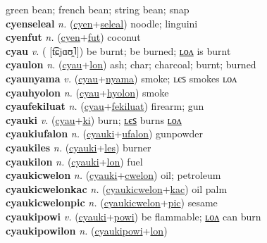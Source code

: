 green bean; french bean; string bean; snap \label{cyencim} \\
\textbf{cyenseleal} \textit{n.} (\hyperref[cyen]{cyen}+\hyperref[seleal]{seleal})
noodle; linguini \label{cyenseleal} \\
\textbf{cyenfut} \textit{n.} (\hyperref[cyen]{cyen}+\hyperref[fut]{fut})
coconut \label{cyenfut} \\
\textbf{cyau} \textit{v.} ( [t͡ɕjɑʊ̯˥])
be burnt; be burned; \hyperref[cyaulon]{ʟᴏᴧ} is burnt \label{cyau} \\
\textbf{cyaulon} \textit{n.} (\hyperref[cyau]{cyau}+\hyperref[lon]{lon})
ash; char; charcoal; burnt; burned \label{cyaulon} \\
\textbf{cyaunyama} \textit{v.} (\hyperref[cyau]{cyau}+\hyperref[nyama]{nyama})
smoke; ʟєꜱ smokes ʟᴏᴧ \label{cyaunyama} \\
\textbf{cyauhyolon} \textit{n.} (\hyperref[cyau]{cyau}+\hyperref[hyolon]{hyolon})
smoke \label{cyauhyolon} \\
\textbf{cyaufekiluat} \textit{n.} (\hyperref[cyau]{cyau}+\hyperref[fekiluat]{fekiluat})
firearm; gun \label{cyaufekiluat} \\
\textbf{cyauki} \textit{v.} (\hyperref[cyau]{cyau}+\hyperref[ki]{ki})
burn; \hyperref[cyaukiles]{ʟєꜱ} burns \hyperref[cyaukilon]{ʟᴏᴧ} \label{cyauki} \\
\textbf{cyaukiufalon} \textit{n.} (\hyperref[cyauki]{cyauki}+\hyperref[ufalon]{ufalon})
gunpowder \label{cyaukiufalon} \\
\textbf{cyaukiles} \textit{n.} (\hyperref[cyauki]{cyauki}+\hyperref[les]{les})
burner \label{cyaukiles} \\
\textbf{cyaukilon} \textit{n.} (\hyperref[cyauki]{cyauki}+\hyperref[lon]{lon})
fuel \label{cyaukilon} \\
\textbf{cyaukicwelon} \textit{n.} (\hyperref[cyauki]{cyauki}+\hyperref[cwelon]{cwelon})
oil; petroleum \label{cyaukicwelon} \\
\textbf{cyaukicwelonkac} \textit{n.} (\hyperref[cyaukicwelon]{cyaukicwelon}+\hyperref[kac]{kac})
oil palm \label{cyaukicwelonkac} \\
\textbf{cyaukicwelonpic} \textit{n.} (\hyperref[cyaukicwelon]{cyaukicwelon}+\hyperref[pic]{pic})
sesame \label{cyaukicwelonpic} \\
\textbf{cyaukipowi} \textit{v.} (\hyperref[cyauki]{cyauki}+\hyperref[powi]{powi})
be flammable; \hyperref[cyaukipowilon]{ʟᴏᴧ} can burn \label{cyaukipowi} \\
\textbf{cyaukipowilon} \textit{n.} (\hyperref[cyaukipowi]{cyaukipowi}+\hyperref[lon]{lon})
